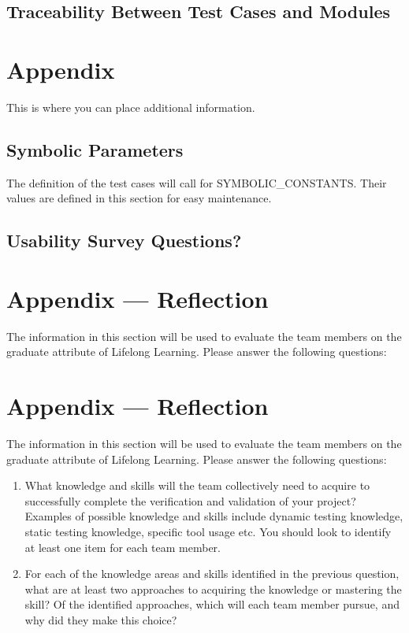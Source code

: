 \documentclass[12pt, titlepage]{article}
\begin{document}
\subsection{Traceability Between Test Cases and Modules}

				




\newpage

\section{Appendix}

This is where you can place additional information.

\subsection{Symbolic Parameters}

The definition of the test cases will call for SYMBOLIC\_CONSTANTS.
Their values are defined in this section for easy maintenance.

\subsection{Usability Survey Questions?}


\newpage{}
\section*{Appendix --- Reflection}

The information in this section will be used to evaluate the team members on the
graduate attribute of Lifelong Learning.  Please answer the following questions:

\newpage{}
\section*{Appendix --- Reflection}

The information in this section will be used to evaluate the team members on the
graduate attribute of Lifelong Learning.  Please answer the following questions:

\begin{enumerate}
  \item What knowledge and skills will the team collectively need to acquire to
  successfully complete the verification and validation of your project?
  Examples of possible knowledge and skills include dynamic testing knowledge,
  static testing knowledge, specific tool usage etc.  You should look to
  identify at least one item for each team member.
  \item For each of the knowledge areas and skills identified in the previous
  question, what are at least two approaches to acquiring the knowledge or
  mastering the skill?  Of the identified approaches, which will each team
  member pursue, and why did they make this choice?
\end{enumerate}
\end{document}
